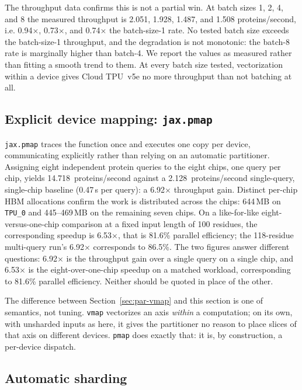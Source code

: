 The throughput data confirms this is not a partial win. At batch sizes
1, 2, 4, and 8 the measured throughput is 2.051, 1.928, 1.487, and
1.508 proteins/second, i.e. 0.94$\times$, 0.73$\times$, and
0.74$\times$ the batch-size-1 rate.
No tested batch size exceeds the batch-size-1 throughput, and the
degradation is not monotonic: the batch-8 rate is marginally higher
than batch-4. We report the values as measured rather than fitting a
smooth trend to them. At every batch size tested, vectorization within
a device gives Cloud TPU~v5e no more throughput than not batching at
all.

\subsection{Explicit device mapping: \texttt{jax.pmap}}
\label{sec:par-pmap}

\texttt{jax.pmap} traces the function once and executes one copy per
device, communicating explicitly rather than relying on an
automatic partitioner. Assigning eight independent protein queries to
the eight chips, one query per chip, yields
14.718~proteins/second against a 2.128~proteins/second single-query,
single-chip baseline (0.47\,s per query): a 6.92$\times$ throughput
gain.
Distinct per-chip HBM allocations confirm the work is distributed
across the chips: 644\,MB on
\texttt{TPU\_0} and 445--469\,MB on the remaining seven chips.
On a like-for-like eight-versus-one-chip comparison at a fixed input
length of 100 residues, the corresponding speedup is 6.53$\times$,
that is 81.6\% parallel efficiency; the 118-residue multi-query run's
6.92$\times$ corresponds to 86.5\%.
The two figures answer different questions: 6.92$\times$ is the
throughput gain over a single query on a single chip, and 6.53$\times$
is the eight-over-one-chip speedup on a matched workload,
corresponding to 81.6\% parallel efficiency. Neither should be quoted
in place of the other.

The difference between Section~\ref{sec:par-vmap} and this section is one of
semantics, not tuning. \texttt{vmap} vectorizes an axis
\emph{within} a computation; on its own, with unsharded inputs as
here, it gives the partitioner no reason to place slices of that axis
on different devices. \texttt{pmap} does exactly that: it is, by construction, a
per-device dispatch.

\subsection{Automatic sharding}
\label{sec:par-gspmd}

